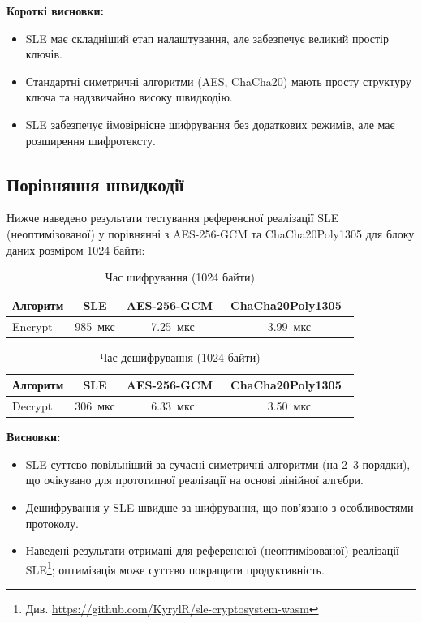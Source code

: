 \textbf{Короткі висновки:}
\begin{itemize}
    \item SLE має складніший етап налаштування, але забезпечує великий простір ключів.
    \item Стандартні симетричні алгоритми (AES, ChaCha20) мають просту структуру ключа та надзвичайно високу швидкодію.
    \item SLE забезпечує ймовірнісне шифрування без додаткових режимів, але має розширення шифротексту.
\end{itemize}

\subsection{Порівняння швидкодії}

Нижче наведено результати тестування референсної реалізації SLE (неоптимізованої) у порівнянні з AES-256-GCM та ChaCha20Poly1305 для блоку даних розміром 1024 байти:

\begin{table}[h!]
\centering
\begin{tabular}{|l|c|c|c|}
\hline
\textbf{Алгоритм} & \textbf{SLE} & \textbf{AES-256-GCM}~\cite{nist_gcm, rustcrypto_aes} & \textbf{ChaCha20Poly1305}~\cite{25, rustcrypto_chacha} \\
\hline
Encrypt & 985~мкс & 7.25~мкс & 3.99~мкс \\
\hline
\end{tabular}
\caption{Час шифрування (1024 байти)}
\label{tab:table3}
\end{table}

\begin{table}[h!]
\centering
\begin{tabular}{|l|c|c|c|}
\hline
\textbf{Алгоритм} & \textbf{SLE} & \textbf{AES-256-GCM}~\cite{nist_gcm, rustcrypto_aes} & \textbf{ChaCha20Poly1305}~\cite{25, rustcrypto_chacha} \\
\hline
Decrypt & 306~мкс & 6.33~мкс & 3.50~мкс \\
\hline
\end{tabular}
\caption{Час дешифрування (1024 байти)}
\label{tab:table4}
\end{table}

\textbf{Висновки:}
\begin{itemize}
    \item SLE суттєво повільніший за сучасні симетричні алгоритми (на 2--3 порядки), що очікувано для прототипної реалізації на основі лінійної алгебри.
    \item Дешифрування у SLE швидше за шифрування, що пов'язано з особливостями протоколу.
    \item Наведені результати отримані для референсної (неоптимізованої) реалізації SLE\footnote{Див. \url{https://github.com/KyrylR/sle-cryptosystem-wasm}}; оптимізація може суттєво покращити продуктивність.
\end{itemize}

